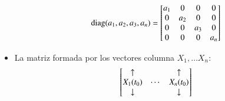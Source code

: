 \begin{multicols}{2}
\begin{itemize}
            $$ \operatorname{diag}(a_1, a_2, a_3, a_n) =
                \left[\begin{matrix}
                    a_1 & 0  & 0  & 0  \\
                     0  &a_2 & 0  & 0  \\
                     0  & 0  & a_3& 0  \\
                     0  & 0  & 0  & a_n
                \end{matrix}\right]
            $$
        \item La matriz formada por los vectores columna $X_1, \ldots X_n$:
        $$
        \left[\begin{matrix}\uparrow && \uparrow\\ X_1(t_0) & \cdots & X_n(t_0) \\ \downarrow && \downarrow\end{matrix}\right]
        $$
    \end{itemize}
\end{multicols}
